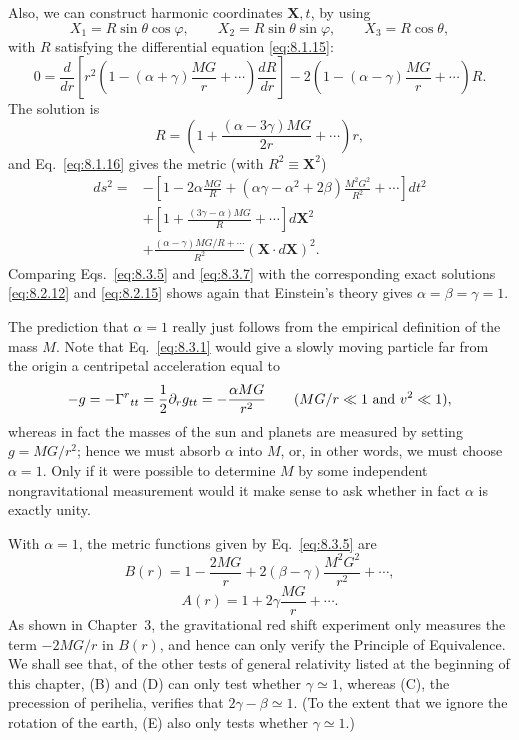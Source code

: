 Also, we can construct harmonic coordinates \(\mathbf{X},t\), by using
\[
  X_1=R\sin\theta\cos\varphi,\qquad
  X_2=R\sin\theta\sin\varphi,\qquad
  X_3=R\cos\theta,
\]
with \(R\) satisfying the differential equation \eqref{eq:8.1.15}:
\[
  0
  =
  \frac{d}{dr}
  \left[
    r^2\left(1-(\alpha+\gamma)\frac{MG}{r}+\cdots\right)
    \frac{dR}{dr}
  \right]
  -2\left(1-(\alpha-\gamma)\frac{MG}{r}+\cdots\right)R.
\]
The solution is
\begin{equation}
  R
  =
  \left(1+\frac{(\alpha-3\gamma)MG}{2r}+\cdots\right)r,
  \tag{8.3.6}\label{eq:8.3.6}
\end{equation}
and Eq.~\eqref{eq:8.1.16} gives the metric (with
\(R^2\equiv\mathbf{X}^2\))
\begin{equation}
  \begin{split}
  ds^2={}&
  -\left[
    1-2\alpha\frac{MG}{R}
    +(\alpha\gamma-\alpha^2+2\beta)\frac{M^2G^2}{R^2}
    +\cdots
  \right]dt^2\\
  &+
  \left[1+\frac{(3\gamma-\alpha)MG}{R}+\cdots\right]
  d\mathbf{X}^2\\
  &+
  \frac{(\alpha-\gamma)MG/R+\cdots}{R^2}
  (\mathbf{X}\cdot d\mathbf{X})^2.
  \end{split}
  \tag{8.3.7}\label{eq:8.3.7}
\end{equation}
Comparing Eqs.~\eqref{eq:8.3.5} and \eqref{eq:8.3.7} with the
corresponding exact solutions \eqref{eq:8.2.12} and \eqref{eq:8.2.15}
shows again that Einstein's theory gives \(\alpha=\beta=\gamma=1\).

The prediction that \(\alpha=1\) really just follows from the empirical
definition of the mass \(M\). Note that Eq.~\eqref{eq:8.3.1} would give a
slowly moving particle far from the origin a centripetal acceleration equal
to
\[
  -g=-\Gamma^r{}_{tt}
  =\frac12\partial_r g_{tt}
  =-\frac{\alpha MG}{r^2}
  \qquad
  (MG/r\ll1\ \hbox{and}\ v^2\ll1),
\]
whereas in fact the masses of the sun and planets are measured by setting
\(g=MG/r^2\); hence we must absorb \(\alpha\) into \(M\), or, in other
words, we must choose \(\alpha=1\). Only if it were possible to determine
\(M\) by some independent nongravitational measurement would it make sense
to ask whether in fact \(\alpha\) is exactly unity.

With \(\alpha=1\), the metric functions given by Eq.~\eqref{eq:8.3.5}
are
\begin{equation}
  B(r)
  =
  1-\frac{2MG}{r}
  +2(\beta-\gamma)\frac{M^2G^2}{r^2}+\cdots,
  \tag{8.3.8}\label{eq:8.3.8}
\end{equation}
\begin{equation}
  A(r)=1+2\gamma\frac{MG}{r}+\cdots.
  \tag{8.3.9}\label{eq:8.3.9}
\end{equation}
As shown in Chapter~3, the gravitational red shift experiment only
measures the term \(-2MG/r\) in \(B(r)\), and hence can only verify the
Principle of Equivalence. We shall see that, of the other tests of general
relativity listed at the beginning of this chapter, (B) and (D) can only
test whether \(\gamma\simeq1\), whereas (C), the precession of perihelia,
verifies that \(2\gamma-\beta\simeq1\). (To the extent that we ignore the
rotation of the earth, (E) also only tests whether \(\gamma\simeq1\).)
